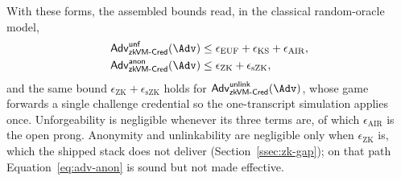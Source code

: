 With these forms, the assembled bounds read, in the classical random-oracle model,
\begin{align}
  \mathsf{Adv}^{\mathsf{unf}}_{\mathsf{zkVM\text{-}Cred}}(\Adv)
  &\le \epsilon_{\mathrm{EUF}} + \epsilon_{\mathrm{KS}} + \epsilon_{\mathrm{AIR}},
  \label{eq:adv-unf}\\
  \mathsf{Adv}^{\mathsf{anon}}_{\mathsf{zkVM\text{-}Cred}}(\Adv)
  &\le \epsilon_{\mathrm{ZK}} + \epsilon_{\mathrm{sZK}},
  \label{eq:adv-anon}
\end{align}
and the same bound $\epsilon_{\mathrm{ZK}}+\epsilon_{\mathrm{sZK}}$ holds for
$\mathsf{Adv}^{\mathsf{unlink}}_{\mathsf{zkVM\text{-}Cred}}(\Adv)$, whose game forwards a single challenge
credential so the one-transcript simulation applies once. Unforgeability is negligible whenever its
three terms are, of which $\epsilon_{\mathrm{AIR}}$ is the open prong. Anonymity and unlinkability are
negligible only when $\epsilon_{\mathrm{ZK}}$ is, which the shipped stack does not deliver
(Section~\ref{ssec:zk-gap}); on that path Equation~\eqref{eq:adv-anon} is sound but not made
effective.



